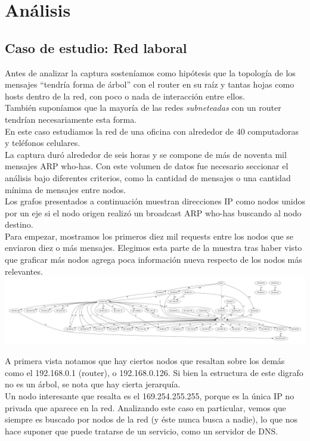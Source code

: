 \section{Análisis}

\subsection{Caso de estudio: Red laboral}

\indent \indent Antes de analizar la captura sosteníamos como hipótesis que la topología de los mensajes ``tendría forma de árbol'' con el router en su raíz y tantas hojas como hosts dentro de la red, con poco o nada de interacción entre ellos.\\
\indent También suponíamos que la mayoría de las redes \textit{subneteadas} con un router tendrían necesariamente esta forma.\\
\indent En este caso estudiamos la red de una oficina con alrededor de 40 computadoras y teléfonos celulares.\\
\indent La captura duró alrededor de seis horas y se compone de más de noventa mil mensajes ARP who-has. Con este volumen de datos fue necesario seccionar el análisis bajo diferentes criterios, como la cantidad de mensajes o una cantidad mínima de mensajes entre nodos.\\
\indent Los grafos presentados a continuación muestran direcciones IP como nodos unidos por un eje si el nodo origen realizó un broadcast ARP who-has buscando al nodo destino.\\
\indent Para empezar, mostramos los primeros diez mil requests entre los nodos que se enviaron diez o más mensajes. Elegimos esta parte de la muestra tras haber visto que graficar más nodos agrega poca información nueva respecto de los nodos más relevantes.\\

\includegraphics[scale=0.25,angle=90]{graphics/t-work-10000c-10w.png}

\indent A primera vista notamos que hay ciertos nodos que resaltan sobre los demás como el 192.168.0.1 (router), o 192.168.0.126. Si bien la estructura de este digrafo no es un árbol, se nota que hay cierta jerarquía.\\
\indent Un nodo interesante que resalta es el 169.254.255.255, porque es la única IP no privada que aparece en la red. Analizando este caso en particular, vemos que siempre es buscado por nodos de la red (y éste nunca busca a nadie), lo que nos hace suponer que puede tratarse de un servicio, como un servidor de DNS.\\

